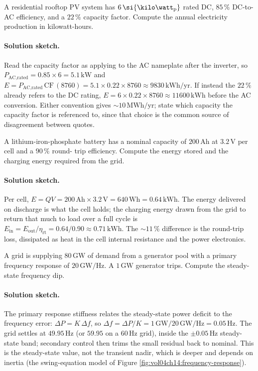 \begin{exercise}
A residential rooftop PV system has $6\,\si{\kilo\watt
\textsubscript{p}}$ rated DC, $85\,\%$ DC-to-AC efficiency, and a
$22\,\%$ capacity factor. Compute the annual electricity production
in kilowatt-hours.
\paragraph{Solution sketch.}
Read the capacity factor as applying to the AC nameplate after the
inverter, so $P_{\text{AC,rated}} = 0.85\times 6 = 5.1\,\si{\kilo\watt}$
and $E = P_{\text{AC,rated}}\,\text{CF}\,(8760) = 5.1\times0.22\times
8760 \approx 9830\,\si{\kilo\watt\hour}/\text{yr}$. If instead the
$22\,\%$ already refers to the DC rating, $E = 6\times0.22\times8760
\approx 11600\,\si{\kilo\watt\hour}$ before the AC conversion. Either
convention gives $\sim 10\,\si{\mega\watt\hour}/\text{yr}$; state which
capacity the capacity factor is referenced to, since that choice is the
common source of disagreement between quotes.
\end{exercise}

\begin{exercise}
A lithium-iron-phosphate battery has a nominal capacity of $200\,\si{
\ampere\hour}$ at $3.2\,\si{\volt}$ per cell and a $90\,\%$ round-
trip efficiency. Compute the energy stored and the charging energy
required from the grid.
\paragraph{Solution sketch.}
Per cell, $E = QV = 200\,\si{\ampere\hour}\times3.2\,\si{\volt} = 640\,
\si{\watt\hour} = 0.64\,\si{\kilo\watt\hour}$. The energy delivered on
discharge is what the cell holds; the charging energy drawn from the
grid to return that much to load over a full cycle is $E_{\text{in}} =
E_{\text{out}}/\eta_{\text{rt}} = 0.64/0.90 \approx 0.71\,\si{\kilo\watt
\hour}$. The $\sim 11\,\%$ difference is the round-trip loss, dissipated
as heat in the cell internal resistance and the power electronics.
\end{exercise}

\begin{exercise}
A grid is supplying $80\,\si{\giga\watt}$ of demand from a generator
pool with a primary frequency response of $20\,\si{\giga\watt\per
\hertz}$. A $1\,\si{\giga\watt}$ generator trips. Compute the
steady-state frequency dip.
\paragraph{Solution sketch.}
The primary response stiffness relates the steady-state power deficit
to the frequency error: $\Delta P = K\,\Delta f$, so $\Delta f =
\Delta P / K = 1\,\si{\giga\watt}/20\,\si{\giga\watt\per\hertz} = 0.05\,
\si{\hertz}$. The grid settles at $49.95\,\si{\hertz}$ (or $59.95$ on a
$60\,\si{\hertz}$ grid), inside the $\pm 0.05\,\si{\hertz}$ steady-state
band; secondary control then trims the small residual back to nominal.
This is the steady-state value, not the transient nadir, which is deeper
and depends on inertia (the swing-equation model of Figure
\ref{fig:vol04ch14:frequency-response}).
\end{exercise}


